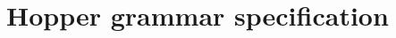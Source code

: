 \chapter{Hopper grammar specification} \label{app:grammar}
\lstset{basicstyle=\ttfamily\scriptsize}
